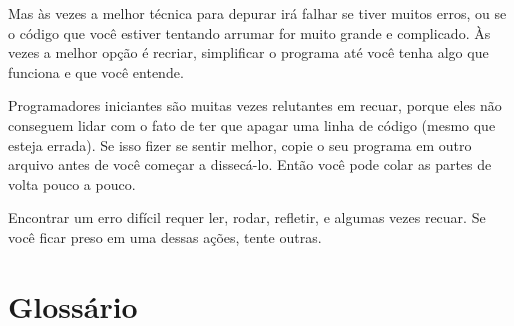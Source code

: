 Mas às vezes a melhor técnica para depurar irá falhar se tiver muitos erros,
ou se o código que você estiver tentando arrumar for muito grande e complicado.
Às vezes a melhor opção é recriar, simplificar o programa até você tenha algo
que funciona e que você entende.

Programadores iniciantes são muitas vezes relutantes em recuar, porque eles
não conseguem lidar com o fato de ter que apagar uma linha de código (mesmo que
esteja errada). Se isso fizer se sentir melhor, copie o seu programa em outro
arquivo antes de você começar a dissecá-lo. Então você pode colar as partes
de volta pouco a pouco.

Encontrar um erro difícil requer ler, rodar, refletir, e algumas vezes recuar.
Se você ficar preso em uma dessas ações, tente outras.


\section{Glossário}

